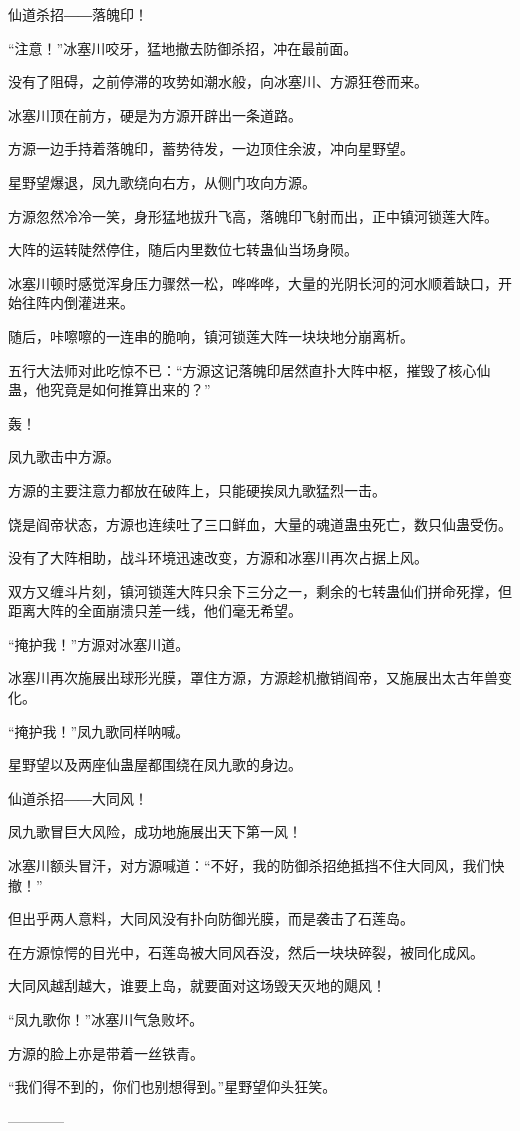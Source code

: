 \begin{this_body}
仙道杀招――落魄印！

“注意！”冰塞川咬牙，猛地撤去防御杀招，冲在最前面。

没有了阻碍，之前停滞的攻势如潮水般，向冰塞川、方源狂卷而来。

冰塞川顶在前方，硬是为方源开辟出一条道路。

方源一边手持着落魄印，蓄势待发，一边顶住余波，冲向星野望。

星野望爆退，凤九歌绕向右方，从侧门攻向方源。

方源忽然冷冷一笑，身形猛地拔升飞高，落魄印飞射而出，正中镇河锁莲大阵。

大阵的运转陡然停住，随后内里数位七转蛊仙当场身陨。

冰塞川顿时感觉浑身压力骤然一松，哗哗哗，大量的光阴长河的河水顺着缺口，开始往阵内倒灌进来。

随后，咔嚓嚓的一连串的脆响，镇河锁莲大阵一块块地分崩离析。

五行大法师对此吃惊不已：“方源这记落魄印居然直扑大阵中枢，摧毁了核心仙蛊，他究竟是如何推算出来的？”

轰！

凤九歌击中方源。

方源的主要注意力都放在破阵上，只能硬挨凤九歌猛烈一击。

饶是阎帝状态，方源也连续吐了三口鲜血，大量的魂道蛊虫死亡，数只仙蛊受伤。

没有了大阵相助，战斗环境迅速改变，方源和冰塞川再次占据上风。

双方又缠斗片刻，镇河锁莲大阵只余下三分之一，剩余的七转蛊仙们拼命死撑，但距离大阵的全面崩溃只差一线，他们毫无希望。

“掩护我！”方源对冰塞川道。

冰塞川再次施展出球形光膜，罩住方源，方源趁机撤销阎帝，又施展出太古年兽变化。

“掩护我！”凤九歌同样呐喊。

星野望以及两座仙蛊屋都围绕在凤九歌的身边。

仙道杀招――大同风！

凤九歌冒巨大风险，成功地施展出天下第一风！

冰塞川额头冒汗，对方源喊道：“不好，我的防御杀招绝抵挡不住大同风，我们快撤！”

但出乎两人意料，大同风没有扑向防御光膜，而是袭击了石莲岛。

在方源惊愕的目光中，石莲岛被大同风吞没，然后一块块碎裂，被同化成风。

大同风越刮越大，谁要上岛，就要面对这场毁天灭地的飓风！

“凤九歌你！”冰塞川气急败坏。

方源的脸上亦是带着一丝铁青。

“我们得不到的，你们也别想得到。”星野望仰头狂笑。

------------

\end{this_body}

